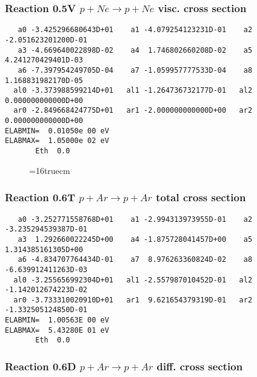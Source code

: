 \documentclass[12pt,dvipdfmx]{article}
\begin{document}
\subsubsection{
Reaction 0.5V   $ p + Ne \rightarrow p + Ne  $ visc. cross
section }


\begin{small}\begin{verbatim}
   a0 -3.425296680643D+01    a1 -4.079254123231D-01    a2 -2.051623201200D-01
   a3 -4.669640022898D-02    a4  1.746802660208D-02    a5  4.241270429401D-03
   a6 -7.397954249705D-04    a7 -1.059957777533D-04    a8  1.168831982170D-05
  al0 -3.373988599214D+01   al1 -1.264736732177D-01   al2  0.000000000000D+00
  ar0 -2.849668424775D+01   ar1 -2.000000000000D+00   ar2  0.000000000000D+00
ELABMIN=  0.01050e 00 eV
ELABMAX=  1.05000e 02 eV
       Eth  0.0
\end{verbatim}\end{small}



\begin{figure} \label{0.5}
\epsfxsize=16truecm
\end{figure}
\newpage



\subsubsection{
Reaction 0.6T   $ p + Ar \rightarrow p + Ar $ total cross
section }



\begin{small}\begin{verbatim}
   a0 -3.252771558768D+01    a1 -2.994313973955D-01    a2 -3.235294539387D-01
   a3  1.292660022245D+00    a4 -1.875728041457D+00    a5  1.314385161305D+00
   a6 -4.834707764434D-01    a7  8.976263360824D-02    a8 -6.639912411263D-03
  al0 -3.255656992304D+01   al1 -2.557987010452D-01   al2 -1.142012674223D-02
  ar0 -3.733310020910D+01   ar1  9.621654379319D-01   ar2 -1.332505124850D-01
ELABMIN=  1.00563E 00 eV
ELABMAX=  5.43280E 01 eV
       Eth  0.0
\end{verbatim}\end{small}

\subsubsection{
Reaction 0.6D    $p + Ar \rightarrow p + Ar  $ diff. cross
section }
\end{document}
